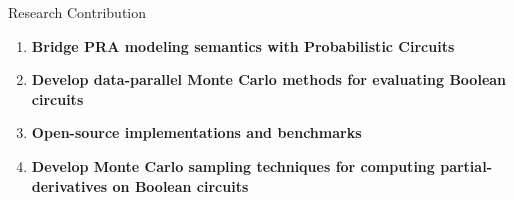 \begin{frame}[allowframebreaks]{Research Contribution}
\begin{enumerate}
\item \textbf{Bridge PRA modeling semantics with Probabilistic Circuits}
\vspace{4pt}
\item \textbf{Develop data-parallel Monte Carlo methods for evaluating Boolean circuits}
\vspace{4pt}
\item \textbf{Open-source implementations and benchmarks}
\vspace{4pt}
\item \textbf{Develop Monte Carlo sampling techniques for computing partial-derivatives on Boolean circuits}  
\end{enumerate}
\end{frame}

